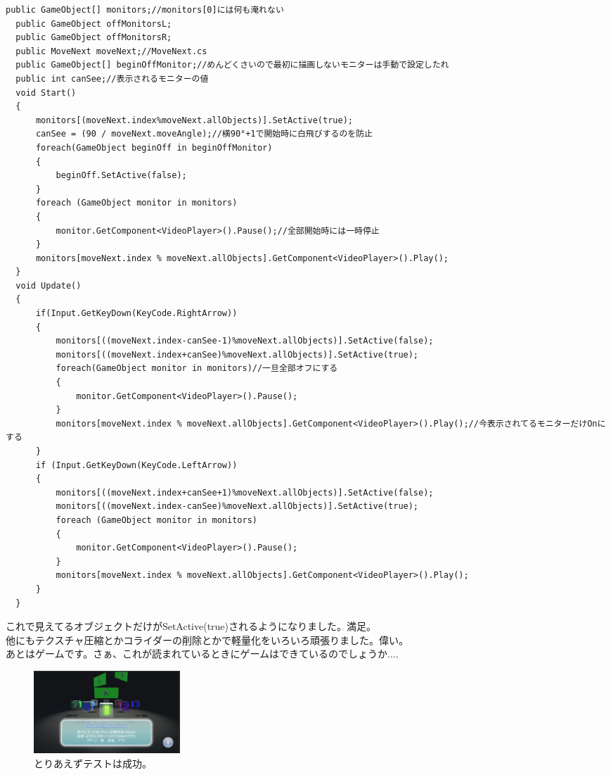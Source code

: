 \documentclass[b5paper,9pt,platex,dvipdfmx]{jsarticle}
\begin{document}
\begin{lstlisting}[caption=Monitor.cs]
  public GameObject[] monitors;//monitors[0]には何も淹れない
  public GameObject offMonitorsL;
  public GameObject offMonitorsR;
  public MoveNext moveNext;//MoveNext.cs
  public GameObject[] beginOffMonitor;//めんどくさいので最初に描画しないモニターは手動で設定したれ
  public int canSee;//表示されるモニターの値
  void Start()
  {
      monitors[(moveNext.index%moveNext.allObjects)].SetActive(true);
      canSee = (90 / moveNext.moveAngle);//横90°+1で開始時に白飛びするのを防止
      foreach(GameObject beginOff in beginOffMonitor)
      {
          beginOff.SetActive(false);
      }
      foreach (GameObject monitor in monitors)
      {
          monitor.GetComponent<VideoPlayer>().Pause();//全部開始時には一時停止
      }
      monitors[moveNext.index % moveNext.allObjects].GetComponent<VideoPlayer>().Play();
  }
  void Update()
  {
      if(Input.GetKeyDown(KeyCode.RightArrow))
      {
          monitors[((moveNext.index-canSee-1)%moveNext.allObjects)].SetActive(false);
          monitors[((moveNext.index+canSee)%moveNext.allObjects)].SetActive(true);
          foreach(GameObject monitor in monitors)//一旦全部オフにする
          {
              monitor.GetComponent<VideoPlayer>().Pause();
          }
          monitors[moveNext.index % moveNext.allObjects].GetComponent<VideoPlayer>().Play();//今表示されてるモニターだけOnにする
      }
      if (Input.GetKeyDown(KeyCode.LeftArrow))
      {
          monitors[((moveNext.index+canSee+1)%moveNext.allObjects)].SetActive(false);
          monitors[((moveNext.index-canSee)%moveNext.allObjects)].SetActive(true);
          foreach (GameObject monitor in monitors)
          {
              monitor.GetComponent<VideoPlayer>().Pause();
          }
          monitors[moveNext.index % moveNext.allObjects].GetComponent<VideoPlayer>().Play();
      }
  }
\end{lstlisting}
\begin{multicols}{3}
これで見えてるオブジェクトだけがSetActive(true)されるようになりました。満足。\\
他にもテクスチャ圧縮とかコライダーの削除とかで軽量化をいろいろ頑張りました。偉い。\\
あとはゲームです。さぁ、これが読まれているときにゲームはできているのでしょうか....\\
\begin{figure}[H]
  \centering
  \includegraphics[width=5.5cm]{7.png}
  \caption{とりあえずテストは成功。}
\end{figure}
\end{multicols}
\end{document}
